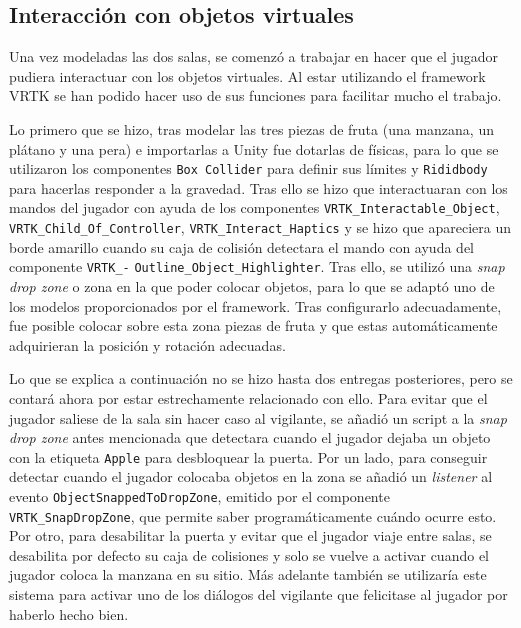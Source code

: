 \subsection{Interacción con objetos virtuales}

Una vez modeladas las dos salas, se comenzó a trabajar en hacer que el jugador pudiera interactuar con los objetos virtuales. Al estar utilizando el framework \acs{VRTK} se han podido hacer uso de sus funciones para facilitar mucho el trabajo.

Lo primero que se hizo, tras modelar las tres piezas de fruta (una manzana, un plátano y una pera) e importarlas a Unity fue dotarlas de físicas, para lo que se utilizaron los componentes \texttt{Box Collider} para definir sus límites y \texttt{Rididbody} para hacerlas responder a la gravedad. Tras ello se hizo que interactuaran con los mandos del jugador con ayuda de los componentes \texttt{VRTK\_Interactable\_Object}, \texttt{VRTK\_Child\_Of\_Controller}, \texttt{VRTK\_Interact\_Haptics} y se hizo que apareciera un borde amarillo cuando su caja de colisión detectara el mando con ayuda del componente \texttt{VRTK\_-} \texttt{Outline\_Object\_Highlighter}. Tras ello, se utilizó una \textit{snap drop zone} o zona en la que poder colocar objetos, para lo que se adaptó uno de los modelos proporcionados por el framework. Tras configurarlo adecuadamente, fue posible colocar sobre esta zona piezas de fruta y que estas automáticamente adquirieran la posición y rotación adecuadas.

Lo que se explica a continuación no se hizo hasta dos entregas posteriores, pero se contará ahora por estar estrechamente relacionado con ello. Para evitar que el jugador saliese de la sala sin hacer caso al vigilante, se añadió un script a la \textit{snap drop zone} antes mencionada que detectara cuando el jugador dejaba un objeto con la etiqueta \texttt{Apple} para desbloquear la puerta. Por un lado, para conseguir detectar cuando el jugador colocaba objetos en la zona se añadió un \textit{listener} al evento \texttt{ObjectSnappedToDropZone}, emitido por el componente \texttt{VRTK\_SnapDropZone}, que permite saber programáticamente cuándo ocurre esto. Por otro, para desabilitar la puerta y evitar que el jugador viaje entre salas, se desabilita por defecto su caja de colisiones y solo se vuelve a activar cuando el jugador coloca la manzana en su sitio. Más adelante también se utilizaría este sistema para activar uno de los diálogos del vigilante que felicitase al jugador por haberlo hecho bien.

